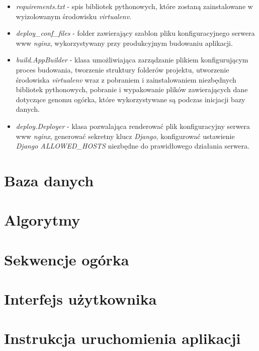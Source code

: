 \begin{itemize}
	\item \textit{requirements.txt} - spis bibliotek pythonowych, które zostaną zainstalowane w wyizolowanym środowisku \textit{virtualenv}.
	
	\item \textit{deploy\_conf\_files} - folder zawierający szablon pliku konfiguracyjnego serwera www \textit{nginx}, wykorzystywany przy produkcyjnym budowaniu aplikacji.
	
	\item \textit{build.AppBuilder} - klasa umożliwiająca zarządzanie plikiem konfigurującym proces budowania, tworzenie struktury folderów projektu, utworzenie środowiska \textit{virtualenv} wraz z pobraniem i zainstalowaniem niezbędnych bibliotek pythonowych, pobranie i wypakowanie plików zawierających dane dotyczące genomu ogórka, które wykorzystywane są podczas inicjacji bazy danych.
	
	\item \textit{deploy.Deployer} - klasa pozwalająca renderować plik konfiguracyjny serwera www \textit{nginx}, generować sekretny klucz \textit{Django}, konfigurować ustawienie \textit{Django ALLOWED\_HOSTS} niezbędne do prawidłowego działania serwera.
\end{itemize}

\section{Baza danych}

\section{Algorytmy}

\section{Sekwencje ogórka}

\section{Interfejs użytkownika}

\section{Instrukcja uruchomienia aplikacji}

